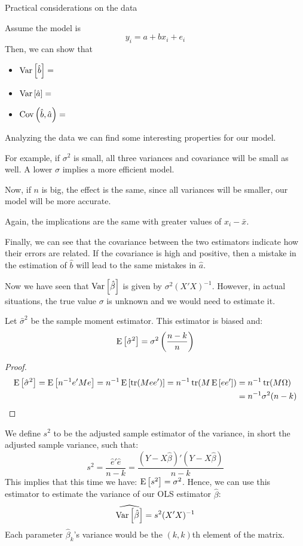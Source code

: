 \begin{bclogo}[couleur=blue!10, arrondi=0.1, logo=,ombre=false]{ Practical considerations on the data} 
\begin{small}
Assume the model is $$y_i = a + bx_i + e_i$$
Then, we can show that \begin{itemize}
\item $\operatorname{Var}\left[\hat b\right] = $
\item $\operatorname{Var}\left[\hat a\right] = $
\item $\operatorname{Cov}\left(\hat b, \hat a\right) = $
\end{itemize}
Analyzing the data we can find some interesting properties for our model.

For example, if $\sigma^2$ is small, all three variances and covariance will be small as well. A lower $\sigma$ implies a more efficient model.

Now, if $n$ is big, the effect is the same, since all variances will be smaller, our model will be more accurate.

Again, the implications are the same with greater values of $x_i - \bar x$.

Finally, we can see that the covariance between the two estimators indicate how their errors are related. If the covariance is high and positive, then a mistake in the estimation of $\hat b$ will lead to the same mistakes in $\hat a$.
\end{small}
\end{bclogo}

Now we have seen that $\operatorname{Var}\left[\hat{\beta}\right]$ is given by $\sigma^2(X'X)^{-1}$. However, in actual situations, the true value $\sigma$ is unknown and we would need to estimate it.

\begin{remark}
Let $\hat\sigma^2$ be the sample moment estimator. This estimator is biased and: $$\operatorname{E}\left[\hat{\sigma}^2\right] = \sigma^2\left(\frac{n-k}{n}\right)$$
\end{remark}
\begin{proof}
\begin{align*}
\operatorname{E}\left[\hat\sigma^2\right] = \operatorname{E}\left[n^{-1}e'Me\right] = n^{-1}\operatorname{E}\left[\operatorname{tr}(Mee')\right] = n^{-1}\operatorname{tr}(M\operatorname{E}\left[ee'\right]) & = n^{-1}\operatorname{tr}(M\Omega) \\ & = n^{-1}\sigma^2(n-k)
\end{align*}
\end{proof}

\begin{definition}
We define $s^2$ to be the adjusted sample estimator of the variance, in short the adjusted sample variance, such that: $$s^2 = \frac{\hat e'\hat e}{n-k}=\frac{(Y - X\hat{\beta})'(Y - X\hat{\beta})}{n-k}$$ This implies that this time we have: $\operatorname{E}\left[s^2\right] = \sigma^2$. 
Hence, we can use this estimator to estimate the variance of our OLS estimator $\hat\beta$: $$\widehat{\operatorname{Var}\left[\hat{\beta}\right]} = s^2(X'X)^{-1}$$ Each parameter $\hat{\beta}_k$'s variance would be the $(k,k)$th element of the matrix.
\end{definition}

